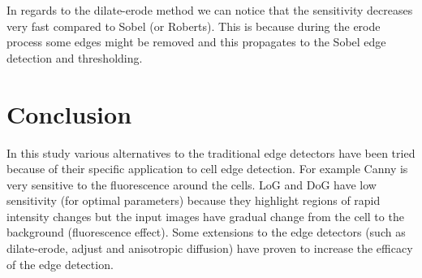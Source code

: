 \documentclass{article}
\begin{document}
In regards to the dilate-erode method
we can notice that the sensitivity decreases very fast compared to Sobel (or Roberts). This is because during the erode process some edges might be removed and this propagates to the Sobel edge detection and thresholding.


	
	\section{Conclusion}
	
	In this study various alternatives to the traditional edge detectors have been
	tried because of their specific application to cell edge detection. For example
	Canny is very sensitive to the fluorescence around the cells. LoG and DoG have
	low sensitivity (for optimal parameters) because they highlight regions
	of rapid intensity changes but the input images have gradual
	change from the cell to the background (fluorescence effect). Some extensions to
	the edge detectors (such as dilate-erode, adjust and anisotropic diffusion)
	have proven to increase the efficacy of the edge detection.
	
\end{document}
